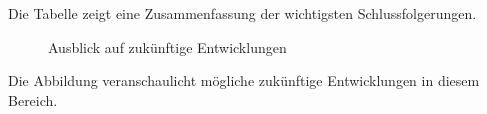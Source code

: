 Die Tabelle zeigt eine Zusammenfassung der wichtigsten Schlussfolgerungen.

\begin{figure}[htbp]
    \centering
    \caption{Ausblick auf zukünftige Entwicklungen}
    \label{fig:ausblick}
\end{figure}

Die Abbildung veranschaulicht mögliche zukünftige Entwicklungen in diesem Bereich.


